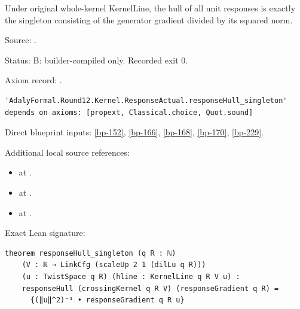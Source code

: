 \begin{theorem}[bp-230]
\label{bp-230}
\leanok
Under original whole-kernel KernelLine, the hull of all unit responses is exactly the singleton consisting of the generator gradient divided by its squared norm.

\par Source: \texttt{}.
\par Status: B: builder-compiled only. Recorded exit 0.
\par Axiom record: \texttt{}.
\begin{verbatim}
'AdalyFormal.Round12.Kernel.ResponseActual.responseHull_singleton' depends on axioms: [propext, Classical.choice, Quot.sound]
\end{verbatim}
\par Direct blueprint inputs: \ref{bp-152}, \ref{bp-166}, \ref{bp-168}, \ref{bp-170}, \ref{bp-229}.
\par Additional local source references:
\begin{itemize}
\item \texttt{} at \texttt{}.
\item \texttt{} at \texttt{}.
\item \texttt{} at \texttt{}.
\end{itemize}
\par Exact Lean signature:
\begin{verbatim}
theorem responseHull_singleton (q R : ℕ)
    (V : ℝ → LinkCfg (scaleUp 2 1 (dilLu q R)))
    (u : TwistSpace q R) (hline : KernelLine q R V u) :
    responseHull (crossingKernel q R V) (responseGradient q R) =
      {(‖u‖^2)⁻¹ • responseGradient q R u}
\end{verbatim}
\end{theorem}

